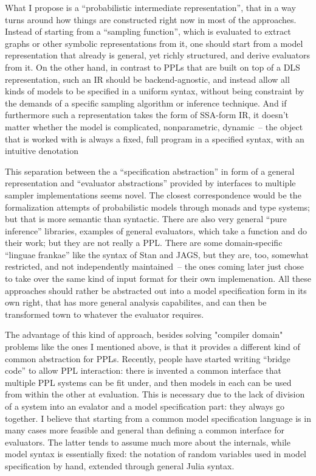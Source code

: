 What I propose is a \enquote{probabilistic intermediate representation}, that in a way turns around
how things are constructed right now in most of the approaches.  Instead of starting from a
\enquote{sampling function}, which is evaluated to extract graphs or other symbolic representations
from it, one should start from a model representation that already is general, yet richly
structured, and derive evaluators from it.  On the other hand, in contrast to PPLs that are built on
top of a DLS representation, such an IR should be backend-agnostic, and instead allow all kinds of
models to be specified in a uniform syntax, without being constraint by the demands of a specific
sampling algorithm or inference technique.  And if furthermore such a representation takes the form
of SSA-form IR, it doesn't matter whether the model is complicated, nonparametric, dynamic~-- the
object that is worked with is always a fixed, full program in a specified syntax, with an intuitive
denotation

This separation between the a \enquote{specification abstraction} in form of a general
representation and \enquote{evaluator abstractions} provided by interfaces to multiple sampler
implementations seems novel.  The closest correspondence would be the formalization attempts of
probabilistic models through monads and type systems; but that is more semantic than syntactic.
There are also very general \enquote{pure inference} libraries, examples of general evaluators,
which take a function and do their work; but they are not really a PPL.  There are some
domain-specific \enquote{linguae frankae} like the syntax of Stan and JAGS, but they are, too,
somewhat restricted, and not independently maintained~-- the ones coming later just chose to take
over the same kind of input format for their own implemenation.  All these approaches should rather
be abstracted out into a model specification form in its own right, that has more general analysis
capabilites, and can then be transformed town to whatever the evaluator requires.

The advantage of this kind of approach, besides solving "compiler domain" problems like the ones I
mentioned above, is that it provides a different kind of common abstraction for PPLs.  Recently,
people have started writing \enquote{bridge code} to allow PPL interaction: there is invented a
common interface that multiple PPL systems can be fit under, and then models in each can be used
from within the other at evaluation.  This is necessary due to the lack of division of a system into
an evalator and a model specification part: they always go together.  I believe that starting from a
common model specification language is in many cases more feasible and general than defining a
common interface for evaluators.  The latter tends to assume much more about the internals, while
model syntax is essentially fixed: the notation of random variables used in model specification by
hand, extended through general Julia syntax.

